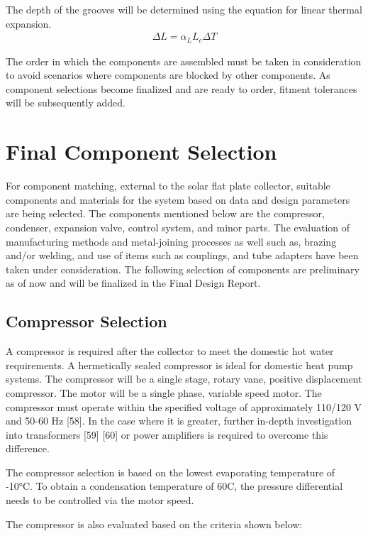 \medskip
The depth of the grooves will be determined using the equation for linear thermal expansion.
\begin{align}
    \Delta L = \alpha_L L_c \Delta T
\end{align}

\medskip
The order in which the components are assembled must be taken in consideration to avoid scenarios where components are blocked by other components. As component selections become finalized and are ready to order, fitment tolerances will be subsequently added.

\newpage
\section{Final Component Selection}

For component matching, external to the solar flat plate collector, suitable components and materials for the system based on data and design parameters are being selected. The components mentioned below are the compressor, condenser, expansion valve, control system, and minor parts. The evaluation of manufacturing methods and metal-joining processes as well such as, brazing and/or welding, and use of items such as couplings, and tube adapters have been taken under consideration. The following selection of components are preliminary as of now and will be finalized in the Final Design Report.

\subsection{Compressor Selection}

A compressor is required after the collector to meet the domestic hot water requirements. A hermetically sealed compressor is ideal for domestic heat pump systems. The compressor will be a single stage, rotary vane, positive displacement compressor. The motor will be a single phase, variable speed motor. The compressor must operate within the specified voltage of approximately 110/120 V and 50-60 Hz [58]. In the case where it is greater, further in-depth investigation into transformers [59] [60] or power amplifiers is required to overcome this difference.

\medskip
The compressor selection is based on the lowest evaporating temperature of -10°C. To obtain a condensation temperature of 60\textdegree C, the pressure differential needs to be controlled via the motor speed.

\medskip
The compressor is also evaluated based on the criteria shown below:

